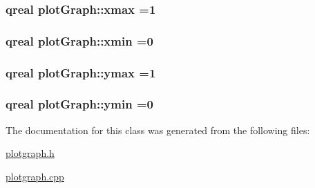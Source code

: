 \hypertarget{classplot_graph_ac270a2ae2617fe5554eb99c9ae631f48}{
\subsubsection[{xmax}]{\setlength{\rightskip}{0pt plus 5cm}qreal plot\-Graph\-::xmax =1\hspace{0.3cm}{\ttfamily [private]}}}\label{classplot_graph_ac270a2ae2617fe5554eb99c9ae631f48}
\hypertarget{classplot_graph_a45c23930851a6130acdc537755e467fa}{
\subsubsection[{xmin}]{\setlength{\rightskip}{0pt plus 5cm}qreal plot\-Graph\-::xmin =0\hspace{0.3cm}{\ttfamily [private]}}}\label{classplot_graph_a45c23930851a6130acdc537755e467fa}
\hypertarget{classplot_graph_a14556cbab64df6e06812a0578041956c}{
\subsubsection[{ymax}]{\setlength{\rightskip}{0pt plus 5cm}qreal plot\-Graph\-::ymax =1\hspace{0.3cm}{\ttfamily [private]}}}\label{classplot_graph_a14556cbab64df6e06812a0578041956c}
\hypertarget{classplot_graph_a5746beef331fbadbf5e1a767b7ed7462}{
\subsubsection[{ymin}]{\setlength{\rightskip}{0pt plus 5cm}qreal plot\-Graph\-::ymin =0\hspace{0.3cm}{\ttfamily [private]}}}\label{classplot_graph_a5746beef331fbadbf5e1a767b7ed7462}


The documentation for this class was generated from the following files\-:\begin{DoxyCompactItemize}
\item 
\hyperlink{plotgraph_8h}{plotgraph.\-h}\item 
\hyperlink{plotgraph_8cpp}{plotgraph.\-cpp}\end{DoxyCompactItemize}
